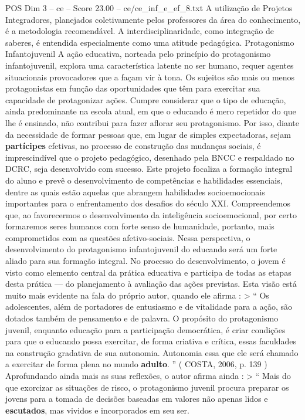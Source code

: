 \begin{textsample}{POS Dim 3 – ce – Score 23.00 – ce/ce\_inf\_e\_ef\_8.txt}
A utilização de Projetos Integradores, planejados coletivamente pelos professores da área do conhecimento, é a metodologia recomendável.
A interdisciplinaridade, como integração de saberes, é entendida especialmente como uma atitude pedagógica.
Protagonismo Infantojuvenil A ação educativa, norteada pelo princípio do protagonismo infantojuvenil, explora uma característica latente no ser humano, requer agentes situacionais provocadores que a façam vir à tona.
Os sujeitos são mais ou menos protagonistas em função das oportunidades que têm para exercitar sua capacidade de protagonizar ações.
Cumpre considerar que o tipo de educação, ainda predominante na escola atual, em que o educando é mero repetidor do que lhe é ensinado, não contribui para fazer aflorar seu protagonismo.
Por isso, diante da necessidade de formar pessoas que, em lugar de simples expectadoras, sejam \textbf{partícipes} efetivas, no processo de construção das mudanças sociais, é imprescindível que o projeto pedagógico, desenhado pela BNCC e respaldado no DCRC, seja desenvolvido com sucesso.
Este projeto focaliza a formação integral do aluno e prevê o desenvolvimento de competências e habilidades essenciais, dentre as quais estão aquelas que abrangem habilidades socioemocionais importantes para o enfrentamento dos desafios do século XXI.
Compreendemos que, ao favorecermos o desenvolvimento da inteligência socioemocional, por certo formaremos seres humanos com forte senso de humanidade, portanto, mais comprometidos com as questões afetivo-sociais.
Nessa perspectiva, o desenvolvimento do protagonismo infantojuvenil do educando será um forte aliado para sua formação integral.
No processo do desenvolvimento, o jovem é visto como elemento central da prática educativa e participa de todas as etapas desta prática — do planejamento à avaliação das ações previstas.
Esta visão está muito mais evidente na fala do próprio autor, quando ele afirma : > “ Os adolescentes, além de portadores de entusiasmo e de vitalidade para a ação, são dotados também de pensamento e de palavra.
O propósito do protagonismo juvenil, enquanto educação para a participação democrática, é criar condições para que o educando possa exercitar, de forma criativa e crítica, essas faculdades na construção gradativa de sua autonomia.
Autonomia essa que ele será chamado a exercitar de forma plena no mundo \textbf{adulto}. ” ( COSTA, 2006, p. 139 ) Aprofundando ainda mais as suas reflexões, o autor afirma ainda : > “ Mais do que exorcizar as situações de risco, o protagonismo juvenil procura preparar os jovens para a tomada de decisões baseadas em valores não apenas lidos e \textbf{escutados}, mas vividos e incorporados em seu ser.

\end{textsample}
